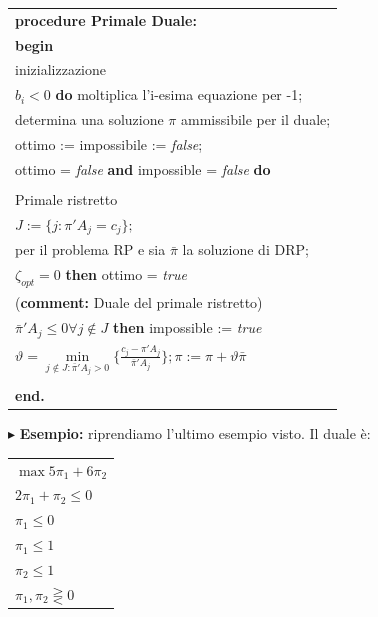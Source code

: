 \documentclass[11pt]{book}
\begin{document}
\small
\begin{center}
\begin{tabular}{||l||}
\hline\hline
{\bf procedure Primale Duale:}\\
{\bf begin}\\
\phantom{aa}{\bf comment:} inizializzazione\\
\phantom{aa}{\bf for each} $b_i < 0$ {\bf do} moltiplica l'i-esima equazione per -1;\\
\phantom{aa}determina una soluzione $\pi$ ammissibile per il duale;\\
\phantom{aa}ottimo := impossibile := {\em false};\\
\phantom{aa}{\bf while} ottimo = {\em false} {\bf and} impossible = {\em false} {\bf do}\\
\phantom{aaaa}{\bf begin}\\
\phantom{aaaaaa}{\bf comment:} Primale ristretto\\
\phantom{aaaaaa}$J := \{j : \pi'A_j = c_j \};$\\
\phantom{aaaaaa}{\bf call Simplesso} per il problema RP e sia $\bar{\pi}$ la soluzione di DRP;\\
\phantom{aaaaaa}{\bf if} $\zeta_{opt} = 0$ {\bf then} ottimo = {\em true}\\
\phantom{aaaaaa}{\bf else} ({\bf comment:} Duale del primale ristretto)\\
\phantom{aaaaaaaa}{\bf if} $\bar{\pi}'A_j \leq 0 \forall j \not\in J$ {\bf then} impossible := {\em true}\\
\phantom{aaaaaaaa}{\bf else} $\vartheta = \min\limits_{j\not\in J : \bar{\pi}'A_j > 0} \bigr\{\frac{c_j - \pi'A_j}{\bar{\pi}'A_j} \bigr\}; \pi := \pi + \vartheta \bar{\pi}$\\
\phantom{aaaa}{\bf end}\\
{\bf end.}\\
\hline\hline
\end{tabular}
\end{center}
\normalsize

\vspace{11pt}$\blacktriangleright$ {\bf Esempio:} riprendiamo l'ultimo
esempio visto. Il duale \`e:

\vspace{11pt}
\begin{center}
\begin{tabular}{l}
$\max 5\pi_1 + 6\pi_2$\\
$2\pi_1 + \pi_2 \leq 0$\\
$\pi_1 \leq 0$\\
$\pi_1 \leq 1$\\
$\pi_2 \leq 1$\\
$\pi_1,\pi_2 \gtreqless 0$\\
\end{tabular}
\end{center}
\vspace{11pt}
\end{document}
